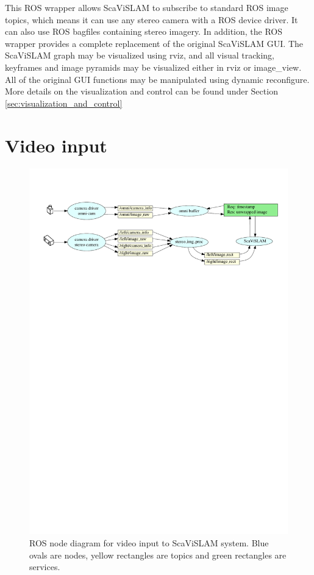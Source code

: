 This ROS wrapper allows ScaViSLAM to subscribe to standard ROS image topics, which means it can use any stereo camera with a ROS device driver.  It can also use ROS bagfiles containing stereo imagery.  In addition, the ROS wrapper provides a complete replacement of the original ScaViSLAM GUI.  The ScaViSLAM graph may be visualized using rviz, and all visual tracking, keyframes and image pyramids may be visualized either in rviz or image\_view.  All of the original GUI functions may be manipulated using dynamic reconfigure.  More details on the visualization and control can be found under Section \ref{sec:visualization_and_control}

\section{Video input}
\label{sec:video_input}

\begin{figure}[h]
  \centering
    \includegraphics[width=1.0\textwidth]{chapters/images/input_architecture}
  \caption{ROS node diagram for video input to ScaViSLAM system.  Blue ovals are nodes, yellow rectangles are topics and green rectangles are services.}
  \label{fig:input_architecture}
\end{figure}

